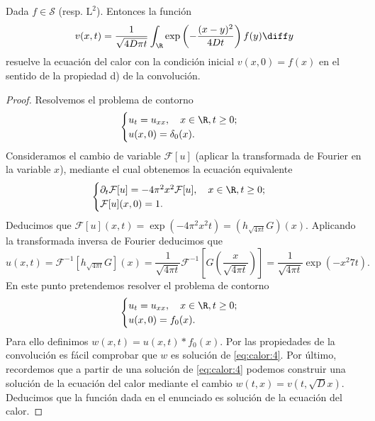 \documentclass{article}
\begin{document}
\begin{theorem}
  Dada $f \in \mathcal{S}$ (resp. $\mathrm{L}^2$). Entonces la función
  \[ v(x,t) = \frac{1}{\sqrt{4 D \pi t}} \int_{\R} \exp\left(- \frac{(x-y)^2}{4 D t}\right) f(y)
    \diff y \] resuelve la ecuación del calor con la condición inicial $v(x,0) = f(x)$ en el sentido
  de la propiedad d) de la convolución.
\end{theorem}
\begin{proof}
  Resolvemos el problema de contorno
  \begin{equation}
    \label{eq:calor:1}
    \begin{cases}
      u_t = u_{xx}, \quad x \in \R, t \ge 0;\\
      u(x, 0) = \delta_0(x).
    \end{cases}
  \end{equation}
  Consideramos el cambio de variable $\mathcal{F}[u]$ (aplicar la transformada de Fourier en la
  variable $x$), mediante el cual obtenemos la ecuación equivalente
  \begin{equation}
    \label{eq:calor:fourier}
    \begin{cases}
      \partial_t \mathcal{F}[u] =- 4 \pi^2 x^2 \mathcal{F}[u], \quad x \in \R, t \ge 0;\\
      \mathcal{F}[u](x, 0) = 1.
    \end{cases}
  \end{equation}
  Deducimos que $\mathcal{F}[u](x,t) = \exp(-4 \pi^2 x^2 t) = (h_{\sqrt{4 \pi t}} G)(x)$.  Aplicando
  la transformada inversa de Fourier deducimos que
  \[u(x,t) = \mathcal{F}^{-1}[h_{\sqrt{4 \pi t}} G](x) = \frac{1}{\sqrt{4 \pi t}}
    \mathcal{F}^{-1}[G(\frac{x}{\sqrt{4 \pi t}})] = \frac{1}{\sqrt{4 \pi t}} \exp(-x^2 7 t). \] En
  este punto pretendemos resolver el problema de contorno
  \begin{equation}
    \label{eq:calor:4}
    \begin{cases}
      u_t = u_{xx}, \quad x \in \R, t \ge 0;\\
      u(x, 0) = f_0(x).
    \end{cases}
  \end{equation}
  Para ello definimos $w(x,t) = u(x,t) * f_0(x)$.  Por las propiedades de la convolución es fácil
  comprobar que $w$ es solución de \eqref{eq:calor:4}. Por último, recordemos que a partir de una
  solución de \eqref{eq:calor:4} podemos construir una solución de la ecuación del calor mediante el
  cambio $w(t,x) = v(t, \sqrt{D}x)$. Deducimos que la función dada en el enunciado es solución de la
  ecuación del calor.
\end{proof}
\end{document}
